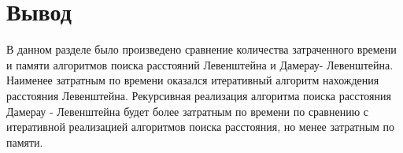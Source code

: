 \section*{Вывод}

В данном разделе было произведено сравнение количества затраченного времени и памяти алгоритмов поиска расстояний Левенштейна и Дамерау- Левенштейна. 
Наименее затратным по времени оказался итеративный алгоритм нахождения расстояния Левенштейна.
Рекурсивная реализация алгоритма поиска расстояния Дамерау - Левенштейна будет более затратным по времени по сравнению с итеративной реализацией алгоритмов поиска расстояния, но менее затратным по памяти.

